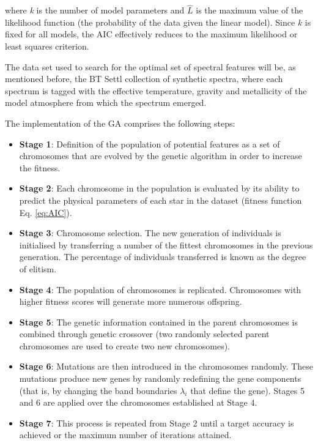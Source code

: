 \zeroindent{}
where \textit{k} is the number of model parameters and $\hat{L}$ is
the maximum value of the likelihood function (the probability of the
data given the linear model). Since $k$ is fixed for all models, the
AIC effectively reduces to the maximum likelihood or least squares
criterion.

The data set used to search for the optimal set of spectral features
will be, as mentioned before, the BT Settl collection of synthetic
spectra, where each spectrum is tagged with the effective temperature,
gravity and metallicity of the model atmosphere from which the
spectrum emerged.

The implementation of the GA comprises the following steps:

\begin{itemize}
\item \textbf{Stage 1}:{ Definition of the population of
potential features as a set of chromosomes that are evolved by the
genetic algorithm in order to increase the fitness.}

\item \textbf{Stage 2}:{ Each chromosome in the population
is evaluated by its ability to predict the physical parameters of each
star in the dataset (fitness function Eq. \ref{eq:AIC}). }

\item \textbf{Stage 3}:{ Chromosome selection. The new
generation of individuals is initialised by transferring a number of
the fittest chromosomes in the previous generation. The percentage of
individuals transferred is known as the degree of elitism.}

\item \textbf{Stage 4}:{ The population of chromosomes is replicated. 
 Chromosomes with higher fitness scores will generate more numerous
 offspring.}

\item \textbf{Stage 5}:{ The genetic information contained in
the parent chromosomes is combined through genetic crossover (two
randomly selected parent chromosomes are used to create two new
chromosomes).}

\item \textbf{Stage 6}:{ Mutations are then introduced in the
chromosomes randomly. These mutations produce new genes by
randomly redefining the gene components (that is, by changing the band
boundaries $\lambda_i$ that define the gene).  Stages 5 and 6 are
applied over the chromosomes established at Stage 4.}

\item \textbf{Stage 7}:{ This process is repeated from Stage 2 until 
a target accuracy is achieved or the maximum number of iterations
attained.}

\end{itemize}

